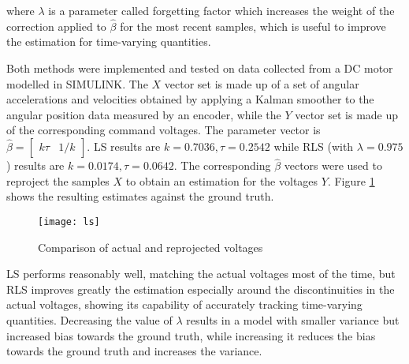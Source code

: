 where $\lambda$ is a parameter called forgetting factor which increases the weight of the correction applied to $\hat\beta$ for the most recent samples, which is useful to improve the estimation for time-varying quantities.

Both methods were implemented and tested on data collected from a DC motor modelled in SIMULINK. The $X$ vector set is made up of a set of angular accelerations and velocities obtained by applying a Kalman smoother to the angular position data measured by an encoder, while the $Y$ vector set is made up of the corresponding command voltages. The parameter vector is $\hat\beta=\begin{bmatrix}
k\tau & 1/k
\end{bmatrix}$. LS results are $k=0.7036,\tau=0.2542$ while RLS (with $\lambda=0.975$) results are $k=0.0174,\tau=0.0642$. The corresponding $\hat\beta$ vectors were used to reproject the samples $X$ to obtain an estimation for the voltages $Y$. Figure \ref{fig:ls} shows the resulting estimates against the ground truth.

\begin{figure}[H]
\centering
\texttt{[image: ls]}
\caption{Comparison of actual and reprojected voltages}
\label{fig:ls}
\end{figure}

LS performs reasonably well, matching the actual voltages most of the time, but RLS improves greatly the estimation especially around the discontinuities in the actual voltages, showing its capability of accurately tracking time-varying quantities.
Decreasing the value of $\lambda$ results in a model with smaller variance but increased bias towards the ground truth, while increasing it reduces the bias towards the ground truth and increases the variance.